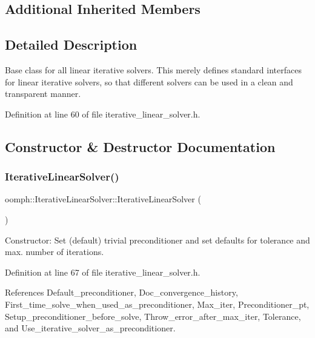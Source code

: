 \subsection*{Additional Inherited Members}


\subsection{Detailed Description}
Base class for all linear iterative solvers. This merely defines standard interfaces for linear iterative solvers, so that different solvers can be used in a clean and transparent manner. 

Definition at line 60 of file iterative\+\_\+linear\+\_\+solver.\+h.



\subsection{Constructor \& Destructor Documentation}
\mbox{\label{classoomph_1_1IterativeLinearSolver_a77f4a929d741d4996f02d2c2b75670cd}} 
\subsubsection{\texorpdfstring{Iterative\+Linear\+Solver()}{IterativeLinearSolver()}\hspace{0.1cm}{\footnotesize\ttfamily [1/2]}}
{\footnotesize\ttfamily oomph\+::\+Iterative\+Linear\+Solver\+::\+Iterative\+Linear\+Solver (\begin{DoxyParamCaption}{ }\end{DoxyParamCaption})\hspace{0.3cm}{\ttfamily [inline]}}



Constructor\+: Set (default) trivial preconditioner and set defaults for tolerance and max. number of iterations. 



Definition at line 67 of file iterative\+\_\+linear\+\_\+solver.\+h.



References Default\+\_\+preconditioner, Doc\+\_\+convergence\+\_\+history, First\+\_\+time\+\_\+solve\+\_\+when\+\_\+used\+\_\+as\+\_\+preconditioner, Max\+\_\+iter, Preconditioner\+\_\+pt, Setup\+\_\+preconditioner\+\_\+before\+\_\+solve, Throw\+\_\+error\+\_\+after\+\_\+max\+\_\+iter, Tolerance, and Use\+\_\+iterative\+\_\+solver\+\_\+as\+\_\+preconditioner.

